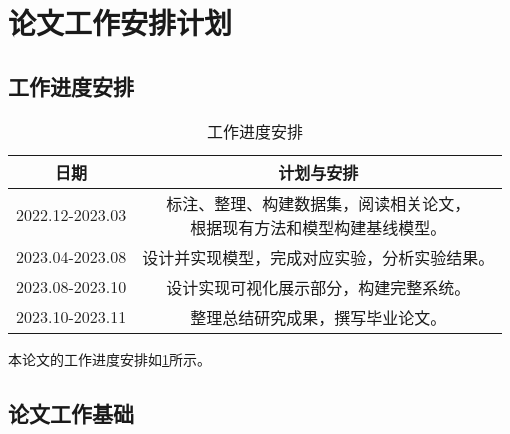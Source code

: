 \section{论文工作安排计划}

\subsection{工作进度安排}

\begin{table}[h]
    \centering
    \begin{tabular}{|c|c|}
        \hline
        \textbf{日期}   & \textbf{计划与安排}                                 \\
        \hline
        2022.12-2023.03 & \makecell[c]{标注、整理、构建数据集，阅读相关论文， \\根据现有方法和模型构建基线模型。}\\
        \hline
        2023.04-2023.08 & 设计并实现模型，完成对应实验，分析实验结果。        \\
        \hline
        2023.08-2023.10 & 设计实现可视化展示部分，构建完整系统。              \\
        \hline
        2023.10-2023.11 & 整理总结研究成果，撰写毕业论文。                    \\
        \hline
    \end{tabular}
    \caption{工作进度安排}
    \label{plan1}
\end{table}

本论文的工作进度安排如\cref{plan1}所示。
\subsection{论文工作基础}

